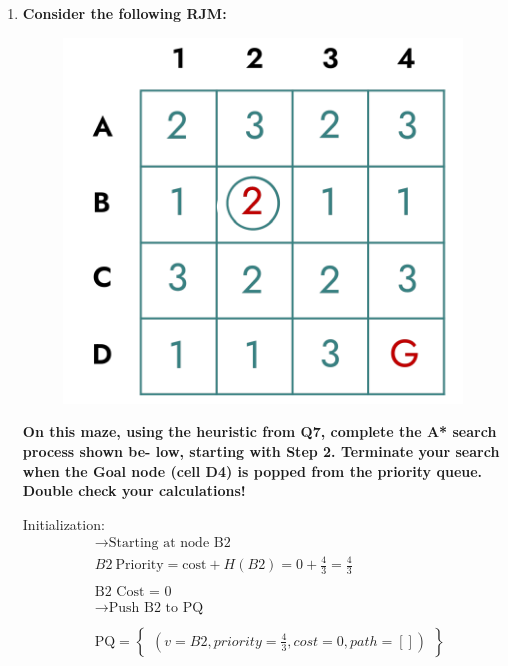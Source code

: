\documentclass[a4paper]{article}
\begin{document}
\begin{sloppypar}
\begin{enumerate}[start=6,label=Q\arabic*,left=0pt]
    \item \textbf{Consider the following RJM:}
    \begin{figure}[H]
        \centering  
        \includegraphics[height=0.2\textheight]{Q8_RJM.png}
        \label{fig:Q8_RJM}
    \end{figure}
    \textbf{On this maze, using the heuristic from Q7, complete the A* search process shown be- low, starting with Step 2. Terminate your search when the Goal node (cell D4) is popped from the priority queue. Double check your calculations!}
    
    \par Initialization:
    \begin{align*}\
        &\rightarrow \text{Starting at node B2} \\
        &B2 \: \text{Priority} = \text{cost} + H(B2) = 0 + \frac{4}{3} = \frac{4}{3} \\\\
        &\text{B2 Cost = 0} \\
        &\rightarrow \text{Push B2 to PQ} \\\\
        &\text{PQ} = \left\{\begin{array}{l}
            (v=B2, priority=\frac{4}{3}, cost=0, path=[])
        \end{array}\right\}
    \end{align*}


\end{enumerate}
\end{sloppypar}
\end{document}
